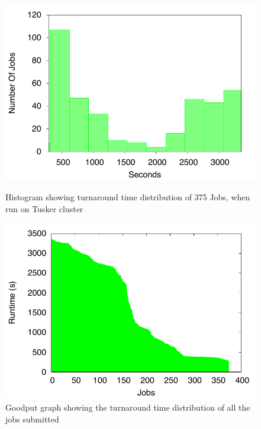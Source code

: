 \documentclass[ms,electronic,double]{nuthesis}
\begin{document}
\begin{figure}[h!]
\begin{center}
\includegraphics{images/tusker_histogram}
\caption{Histogram showing turnaround time distribution of 375 Jobs, when run on Tusker cluster}
\label{fig:tusker_histogram}
\end{center}

\begin{center}
\includegraphics{images/tusker_jobgoodput}
\caption{Goodput graph showing the turnaround time distribution of all the jobs submitted}
\label{fig:tusker_jobgoodput}
\end{center}

\end{figure}
\FloatBarrier
\end{document}

